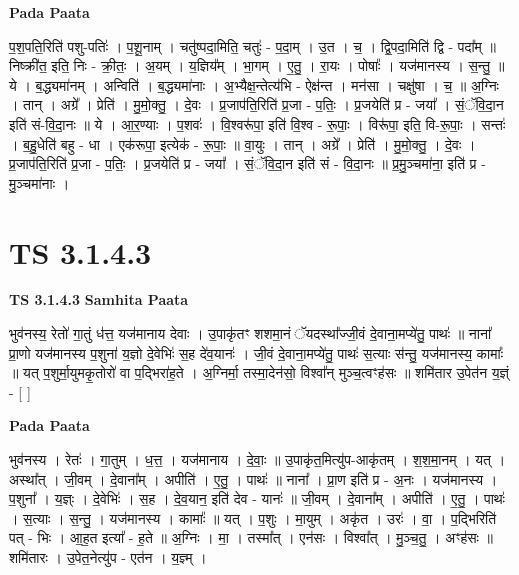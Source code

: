 \documentclass[17pt]{extarticle}
\begin{document}
\textbf{Pada Paata} \newline

प॒श॒पति॒रिति॑ पशु-पतिः॑ । प॒शू॒नाम् । चतु॑ष्पदा॒मिति॒ चतुः॑ - प॒दा॒म् । उ॒त । च॒ । द्वि॒पदा॒मिति॑ द्वि - पदा᳚म् ॥ निष्क्री॑त॒ इति॒ निः - क्री॒तः॒ । अ॒यम् । य॒ज्ञिय᳚म् । भा॒गम् । ए॒तु॒ । रा॒यः । पोषाः᳚ । यज॑मानस्य । स॒न्तु॒ ॥ ये । ब॒द्ध्यमा॑नम् । अन्विति॑ । ब॒द्ध्यमा॑नाः । अ॒भ्यैक्ष॒न्तेत्य॑भि - ऐक्ष॑न्त । मन॑सा । चक्षु॑षा । च॒ ॥ अ॒ग्निः । तान् । अग्रे᳚ । प्रेति॑ । मु॒मो॒क्तु॒ । दे॒वः । प्र॒जाप॑ति॒रिति॑ प्र॒जा - प॒तिः॒ । प्र॒जयेति॑ प्र - जया᳚ । सं॒ॅवि॒दा॒न इति॑ सं-वि॒दा॒नः ॥ ये । आ॒र॒ण्याः । प॒शवः॑ । वि॒श्वरू॑पा॒ इति॑ वि॒श्व - रू॒पाः॒ । विरू॑पा॒ इति॒ वि-रू॒पाः॒ । सन्तः॑ । ब॒हु॒धेति॑ बहु - धा । एक॑रूपा॒ इत्येक॑ - रू॒पाः॒ ॥ वा॒युः । तान् । अग्रे᳚ । प्रेति॑ । मु॒मो॒क्तु॒ । दे॒वः । प्र॒जाप॑ति॒रिति॑ प्र॒जा - प॒तिः॒ । प्र॒जयेति॑ प्र - जया᳚ । सं॒ॅवि॒दा॒न इति॑ सं - वि॒दा॒नः ॥ प्र॒मु॒ञ्चमा॑ना॒ इति॑ प्र - मु॒ञ्चमा॑नाः ।  \newline




\section*{ TS 3.1.4.3 }

\textbf{TS 3.1.4.3 } \newline
\textbf{Samhita Paata} \newline

भुव॑नस्य॒ रेतो॑ गा॒तुं ध॑त्त॒ यज॑मानाय देवाः । उ॒पाकृ॑तꣳ शशमा॒नं ॅयदस्था᳚ज्जी॒वं दे॒वाना॒मप्ये॑तु॒ पाथः॑ ॥ नाना᳚ प्रा॒णो यज॑मानस्य प॒शुना॑ य॒ज्ञो दे॒वेभिः॑ स॒ह दे॑व॒यानः॑ । जी॒वं दे॒वाना॒मप्ये॑तु॒ पाथः॑ स॒त्याः स॑न्तु॒ यज॑मानस्य॒ कामाः᳚ ॥ यत् प॒शुर्मा॒युमकृ॒तोरो॑ वा प॒द्भिरा॑ह॒ते । अ॒ग्निर्मा॒ तस्मा॒देन॑सो॒ विश्वा᳚न् मुञ्च॒त्वꣳह॑सः ॥ शमि॑तार उ॒पेत॑न य॒ज्ञ्ं - [  ] \newline

\textbf{Pada Paata} \newline

भुव॑नस्य । रेतः॑ । गा॒तुम् । ध॒त्त॒ । यज॑मानाय । दे॒वाः॒ ॥ उ॒पाकृ॑त॒मित्यु॑प-आकृ॑तम् । श॒श॒मा॒नम् । यत् । अस्था᳚त् । जी॒वम् । दे॒वाना᳚म् । अपीति॑ । ए॒तु॒ । पाथः॑ ॥ नाना᳚ । प्रा॒ण इति॑ प्र - अ॒नः । यज॑मानस्य । प॒शुना᳚ । य॒ज्ञ्ः । दे॒वेभिः॑ । स॒ह । दे॒व॒यान॒ इति॑ देव - यानः॑ ॥ जी॒वम् । दे॒वाना᳚म् । अपीति॑ । ए॒तु॒ । पाथः॑ । स॒त्याः । स॒न्तु॒ । यज॑मानस्य । कामाः᳚ ॥ यत् । प॒शुः । मा॒युम् । अकृ॑त । उरः॑ । वा॒ । प॒द्भिरिति॑ पत् - भिः । आ॒ह॒त इत्या᳚ - ह॒ते ॥ अ॒ग्निः । मा॒ । तस्मा᳚त् । एन॑सः । विश्वा᳚त् । मु॒ञ्च॒तु॒ । अꣳह॑सः ॥ शमि॑तारः । उ॒पेत॒नेत्यु॑प - एत॑न । य॒ज्ञ्म् ।  \newline
\end{document}
